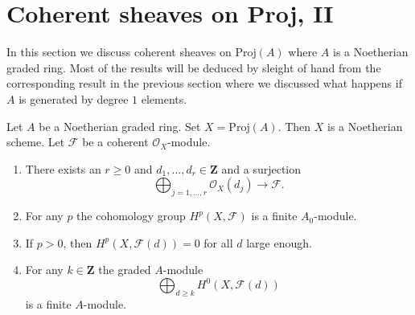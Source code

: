 \section{Coherent sheaves on Proj, II}
\label{section-coherent-proj-general}

\noindent
In this section we discuss coherent sheaves on $\text{Proj}(A)$
where $A$ is a Noetherian graded ring. Most of the results will
be deduced by sleight of hand from the corresponding result in the
previous section where we discussed what happens if $A$ is generated
by degree $1$ elements.

\begin{lemma}
\label{lemma-coherent-on-proj-general}
Let $A$ be a Noetherian graded ring. Set $X = \text{Proj}(A)$. Then $X$
is a Noetherian scheme. Let $\mathcal{F}$ be a coherent $\mathcal{O}_X$-module.
\begin{enumerate}
\item There exists an $r \geq 0$ and
$d_1, \ldots, d_r \in \mathbf{Z}$ and a surjection
$$
\bigoplus\nolimits_{j = 1, \ldots, r} \mathcal{O}_X(d_j)
\longrightarrow \mathcal{F}.
$$
\item For any $p$ the cohomology group $H^p(X, \mathcal{F})$ is a finite
$A_0$-module.
\item If $p > 0$, then $H^p(X, \mathcal{F}(d)) = 0$ for all $d$ large enough.
\item For any $k \in \mathbf{Z}$ the graded $A$-module
$$
\bigoplus\nolimits_{d \geq k} H^0(X, \mathcal{F}(d))
$$
is a finite $A$-module.
\end{enumerate}
\end{lemma}

